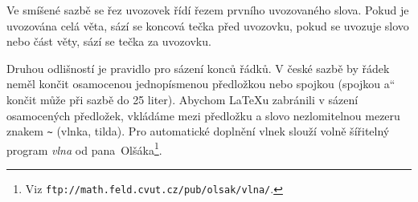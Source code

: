 \documentclass[a4paper, 11pt, twocolumn]{article}
\providecommand{\uv}[1]{\quotedblbase #1\textquotedblleft}
\begin{document}
Ve smíšené sazbě se řez uvozovek řídí řezem první\-ho uvozovaného slova. Pokud je uvozována celá věta, sází se koncová tečka před uvozovku, pokud se uvozuje slovo nebo část věty, sází se tečka za uvozovku.

Druhou odlišností je pravidlo pro sázení konců řádků. V české sazbě by řádek neměl končit osamoce\-nou jednopísmenou předložkou nebo spojkou (spojkou \uv{a} končit může při sazbě do 25 liter). Abychom \LaTeX u zabránili v sázení osamocených předložek, vkládáme mezi předložku a slovo nezlomitelnou mezeru znakem \verb|~| (vlnka, tilda). Pro automatické do\-plnění vlnek slouží volně šířitelný program \emph{vlna} od \mbox{pana Olšáka}\footnote{Viz \texttt{ftp://math.feld.cvut.cz/pub/olsak/vlna/}.}.
\end{document}

